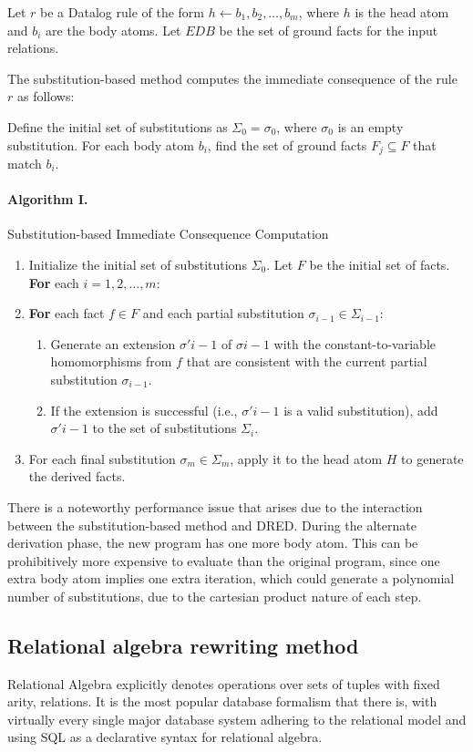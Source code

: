 \documentclass[sigconf,screen,review,natbib]{acmart}
\theoremstyle{definition}
\begin{document}
Let $r$ be a Datalog rule of the form $h \leftarrow b_1, b_2, \ldots, b_m$, where $h$ is the head atom and $b_i$ are
the body atoms. Let $EDB$ be the set of ground facts for the input relations.

The substitution-based method computes the immediate consequence of the rule $r$ as follows:

Define the initial set of substitutions as $\Sigma_0 = { \sigma_0 }$, where $\sigma_0$ is an empty substitution. For
each body atom $b_i$, find the set of ground facts $F_j \subseteq F$ that match $b_i$.

\paragraph{Algorithm I.} Substitution-based Immediate Consequence Computation
\begin{enumerate}
\item Initialize the initial set of substitutions $\Sigma_{0}$. Let $F$ be the initial set of facts.
\textbf{For} each $i = 1, 2, \ldots, m$:
\item \textbf{For} each fact $f \in F$ and each partial substitution $\sigma_{i-1} \in \Sigma_{i-1}$:
\begin{enumerate}
	\item Generate an extension $\sigma'{i-1}$ of $\sigma{i-1}$ with the constant-to-variable homomorphisms from $f$ that are
	      consistent with the current partial substitution $\sigma_{i-1}$.
	\item If the extension is successful (i.e., $\sigma'{i-1}$ is a valid substitution), add $\sigma'{i-1}$ to the set of
	      substitutions $\Sigma_i$.
	      \end {enumerate}
	\item For each final substitution $\sigma_m \in \Sigma_m$, apply it to the head atom $H$ to generate the derived facts.
\end{enumerate}

There is a noteworthy performance issue that arises due to the interaction between the substitution-based method
and DRED. During the alternate derivation phase, the new program has one more body atom. This can be prohibitively
more expensive to evaluate than the original program, since one extra body atom implies one extra iteration, which
could generate a polynomial number of substitutions, due to the cartesian product nature of each step.

\subsection{Relational algebra rewriting method}
Relational Algebra\cite{codd_1970} explicitly denotes operations over sets of tuples with fixed
arity, relations. It is the most popular database formalism that there is, with virtually every single
major database system adhering to the relational model\cite{pg,mysql,sqlserver} and using SQL as a
declarative syntax for relational algebra.
\end{document}
